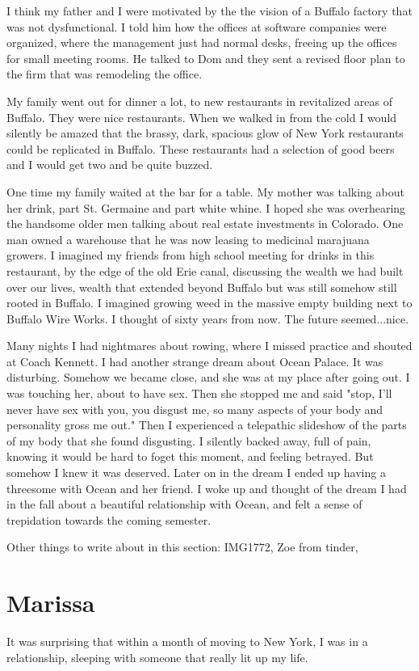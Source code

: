 \documentclass[12pt]{article}
\begin{document}
I think my father and I were motivated by the the vision of a Buffalo factory
that was not dysfunctional.  I told him how the offices at software companies
were organized, where the management just had normal desks, freeing up the
offices for small meeting rooms.  He talked to Dom and they sent a revised floor
plan to the firm that was remodeling the office.

My family went out for dinner a lot, to new restaurants in revitalized areas of
Buffalo.  They were nice restaurants.  When we walked in from the cold I would
silently be amazed that the brassy, dark, spacious glow of New York restaurants
could be replicated in Buffalo. These restaurants had a selection of good beers
and I would get two and be quite buzzed.

One time my family waited at the bar for a table.  My mother was talking about
her drink, part St. Germaine and part white whine.  I hoped she was overhearing
the handsome older men talking about real estate investments in Colorado.  One
man owned a warehouse that he was now leasing to medicinal marajuana growers.  I
imagined my friends from high school meeting for drinks in this restaurant, by
the edge of the old Erie canal, discussing the wealth we had built over our
lives, wealth that extended beyond Buffalo but was still somehow still rooted in
Buffalo.  I imagined growing weed in the massive empty building next to Buffalo
Wire Works.  I thought of sixty years from now.  The future seemed...nice.

Many nights I had nightmares about rowing, where I missed practice and shouted
at Coach Kennett.  I had another strange dream about Ocean Palace.  It was
disturbing.  Somehow we became close, and she was at my place after going out.
I was touching her, about to have sex.  Then she stopped me and said "stop, I'll
never have sex with you, you disgust me, so many aspects of your body and
personality gross me out."  Then I experienced a telepathic slideshow of the
parts of my body that she found disgusting.  I silently backed away, full of
pain, knowing it would be hard to foget this moment, and feeling betrayed. But
somehow I knew it was deserved.  Later on in the dream I ended up having a
threesome with Ocean and her friend.  I woke up and thought of the dream I had
in the fall about a beautiful relationship with Ocean, and felt a sense of
trepidation towards the coming semester.

Other things to write about in this section: IMG1772, Zoe from tinder, 

\section{Marissa}
It was surprising that within a month of moving to New York, I was in a
relationship, sleeping with someone that really lit up my life.
\end{document}
